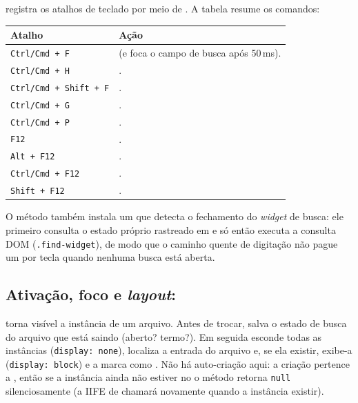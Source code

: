  registra os atalhos de teclado por meio de
. A tabela resume os comandos:

\begin{tabularx}{\linewidth}{Y Y}
\toprule
\textbf{Atalho} & \textbf{Ação} \\
\midrule
\lstinline|Ctrl/Cmd + F| &  (e foca o campo de busca após 50\,ms). \\
\lstinline|Ctrl/Cmd + H| & . \\
\lstinline|Ctrl/Cmd + Shift + F| & . \\
\lstinline|Ctrl/Cmd + G| & . \\
\lstinline|Ctrl/Cmd + P| & . \\
\lstinline|F12| & . \\
\lstinline|Alt + F12| & . \\
\lstinline|Ctrl/Cmd + F12| & . \\
\lstinline|Shift + F12| & . \\
\bottomrule
\end{tabularx}

\noindent
O método também instala um  que detecta o
fechamento do \emph{widget} de busca: ele primeiro consulta o estado próprio
rastreado em  e só então executa a consulta DOM
(\lstinline|.find-widget|), de modo que o caminho quente de digitação não pague
um  por tecla quando nenhuma busca está aberta.

\subsection{Ativação, foco e \emph{layout}: }
\label{sec:editor-setactive}

 torna visível a instância de um arquivo. Antes
de trocar, salva o estado de busca do arquivo que está saindo (aberto? termo?).
Em seguida esconde todas as instâncias (\lstinline|display: none|), localiza a
entrada do arquivo e, se ela existir, exibe-a (\lstinline|display: block|) e a
marca como . Não há auto-criação aqui: a criação pertence a
, então se a instância ainda não estiver no  o
método retorna \lstinline|null| silenciosamente (a IIFE de 
chamará novamente quando a instância existir).

